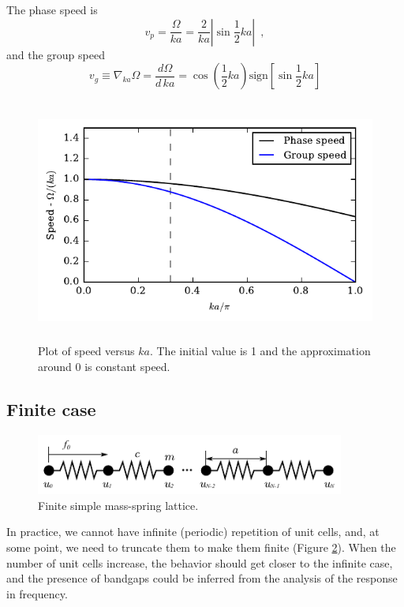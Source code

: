 \documentclass[12pt,letterpaper]{article}
\begin{document}
The phase speed is
\[v_p = \frac{\Omega}{ka} = \frac{2}{ka}\left\vert \sin \frac{1}{2} ka\right\vert \enspace ,\]
and the group speed
\[v_g \equiv \nabla_{ka}\Omega = \frac{d\Omega}{d\, ka} = \cos \left(\frac{1}{2} ka\right) \text{sign}\left[\sin \frac{1}{2} ka\right] \]

\begin{figure}[h]
\centering
\includegraphics[height=8cm]{img/spring-mass-speeds.pdf} 
\caption{Plot of speed versus $ka$. The initial value is 1 and the approximation around 0 is constant speed.}
\label{fig:spring-mass-speed}
\end{figure}



\subsection{Finite case}
\begin{figure}[h]
\centering
\includegraphics[width=4in]{img/spring-mass-finite.pdf} 
\caption{Finite simple mass-spring lattice.}\label{fig:spring-mass-finite}
\end{figure}
In practice, we cannot have infinite (periodic) repetition of unit cells, and, at some point, we need to truncate them to make them finite (Figure \ref{fig:spring-mass-finite}). When the number of unit cells increase, the behavior should get closer to the infinite case, and the presence of bandgaps could be inferred from the analysis of the response in frequency.
\end{document}
